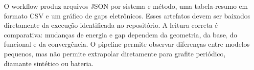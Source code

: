 O workflow produz arquivos JSON por sistema e método, uma tabela-resumo em formato CSV e um gráfico de gaps eletrônicos. Esses artefatos devem ser baixados diretamente da execução identificada no repositório. A leitura correta é comparativa: mudanças de energia e gap dependem da geometria, da base, do funcional e da convergência. O pipeline permite observar diferenças entre modelos pequenos, mas não permite extrapolar diretamente para grafite periódico, diamante sintético ou bateria.
